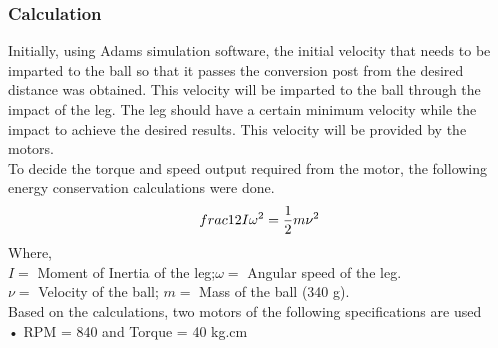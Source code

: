         \subsubsection{Calculation}
            Initially, using Adams simulation software, the initial velocity that needs to be imparted to the ball so that it passes the
            conversion post from the desired distance was obtained. This velocity will be imparted to the ball through the impact of
            the leg. The leg should have a certain minimum velocity while the impact to achieve the desired results. This velocity
            will be provided by the motors.                                                                                                         \\
            To decide the torque and speed output required from the motor, the following energy conservation calculations were
            done.                                                                                                                                   \\   
            $$\\frac{1}{2} I {\omega}^2  =  \frac{1}{2} m {\nu}^2$$     
            Where,                                                                                                                                  \\
            $I =$ Moment of Inertia of the leg;\tab $\omega =$ Angular speed of the leg.                                                            \\
            $\nu =$ Velocity of the ball;      \tab $m =$ Mass of the ball (340 g).                                                                 \\
            Based on the calculations, two motors of the following specifications are used                                                          \\
            •  RPM = 840 and Torque = 40 kg.cm                                                                                                      \\


